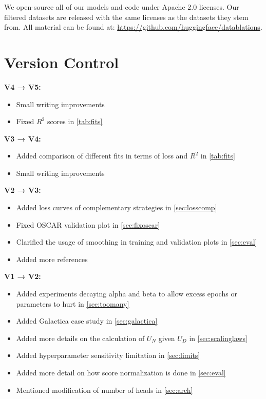 \documentclass{article}
\begin{document}
We open-source all of our models and code under Apache 2.0 licenses. Our filtered datasets are released with the same licenses as the datasets they stem from. All material can be found at: \url{https://github.com/huggingface/datablations}.

\section{Version Control}
\label{sec:vc}

\textbf{V4 → V5:}
\begin{itemize}
    \item Small writing improvements
    \item Fixed $R^2$ scores in \autoref{tab:fits}
\end{itemize}

\textbf{V3 → V4:}
\begin{itemize}
    \item Added comparison of different fits in terms of loss and $R^2$ in \autoref{tab:fits}
    \item Small writing improvements
\end{itemize}

\textbf{V2 → V3:}
\begin{itemize}
    \item Added loss curves of complementary strategies in \autoref{sec:losscomp}
    \item Fixed OSCAR validation plot in \autoref{sec:fixoscar}
    \item Clarified the usage of smoothing in training and validation plots in \autoref{sec:eval}
    \item Added more references
\end{itemize}

\textbf{V1 → V2:}
\begin{itemize}
    \item Added experiments decaying alpha and beta to allow excess epochs or parameters to hurt in \autoref{sec:toomany}  
    \item Added Galactica case study in \autoref{sec:galactica}    
    \item Added more details on the calculation of $U_N$ given $U_D$ in \autoref{sec:scalinglaws}
    \item Added hyperparameter sensitivity limitation in \autoref{sec:limits}
    \item Added more detail on how score normalization is done in \autoref{sec:eval}
    \item Mentioned modification of number of heads in \autoref{sec:arch}    
\end{itemize}
\end{document}
